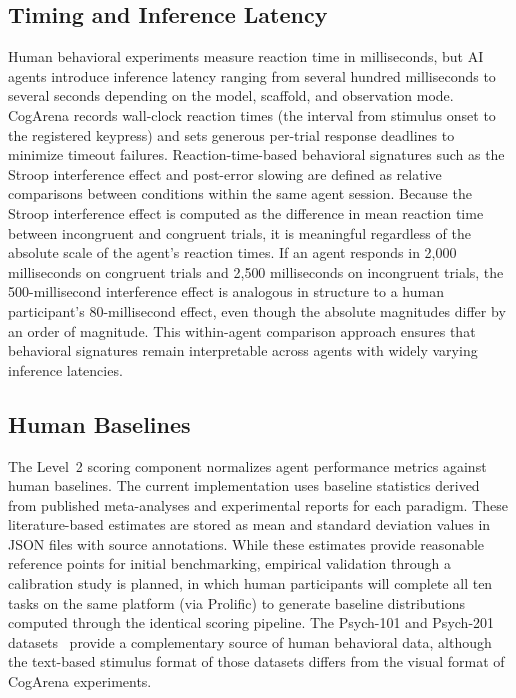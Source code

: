 \documentclass{article}
\begin{document}
\subsection{Timing and Inference Latency}

Human behavioral experiments measure reaction time in milliseconds, but AI agents introduce inference latency ranging from several hundred milliseconds to several seconds depending on the model, scaffold, and observation mode. CogArena records wall-clock reaction times (the interval from stimulus onset to the registered keypress) and sets generous per-trial response deadlines to minimize timeout failures. Reaction-time-based behavioral signatures such as the Stroop interference effect and post-error slowing are defined as relative comparisons between conditions within the same agent session. Because the Stroop interference effect is computed as the difference in mean reaction time between incongruent and congruent trials, it is meaningful regardless of the absolute scale of the agent's reaction times. If an agent responds in 2,000 milliseconds on congruent trials and 2,500 milliseconds on incongruent trials, the 500-millisecond interference effect is analogous in structure to a human participant's 80-millisecond effect, even though the absolute magnitudes differ by an order of magnitude. This within-agent comparison approach ensures that behavioral signatures remain interpretable across agents with widely varying inference latencies.

\subsection{Human Baselines}

The Level~2 scoring component normalizes agent performance metrics against human baselines. The current implementation uses baseline statistics derived from published meta-analyses and experimental reports for each paradigm. These literature-based estimates are stored as mean and standard deviation values in JSON files with source annotations. While these estimates provide reasonable reference points for initial benchmarking, empirical validation through a calibration study is planned, in which human participants will complete all ten tasks on the same platform (via Prolific) to generate baseline distributions computed through the identical scoring pipeline. The Psych-101 and Psych-201 datasets~\citep{binz2024psych101, binz2025psych201} provide a complementary source of human behavioral data, although the text-based stimulus format of those datasets differs from the visual format of CogArena experiments.
\end{document}
